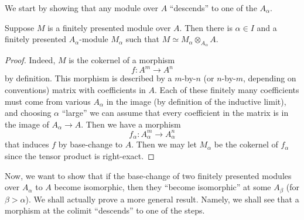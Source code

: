 We start by showing that any module over $A$ ``descends'' to one of the
$A_\alpha$.
\begin{proposition} \label{descentfpmodule} 
Suppose $M$ is a finitely presented module over $A$. Then there is $\alpha \in
I$ and a finitely presented $A_\alpha$-module $M_\alpha$ such that $M \simeq
M_\alpha \otimes_{A_\alpha} A$. 
\end{proposition} 
\begin{proof} 
Indeed, $M$ is the cokernel of a morphism
\[ f: A^m \to A^n   \]
by definition. This morphism is described by a $m$-by-$n$ (or $n$-by-$m$,
depending on conventions) matrix with coefficients in $A$. Each of these
finitely many coefficients must come from various $A_\alpha$ in the image (by
definition of the inductive limit), and choosing $\alpha$ ``large'' we can
assume that every coefficient in the matrix is in the image of $A_\alpha \to A$.
Then we have a morphism
\[ f_\alpha:  A_\alpha^m \to A_\alpha^n  \]
that induces $f$ by base-change to $A$. Then we may let $M_\alpha$ be the
cokernel of $f_\alpha$ since the tensor product is right-exact.
\end{proof} 

Now, we want to show that if the base-change of two finitely presented modules
over $A_\alpha$ to $A$ become isomorphic, then they ``become isomorphic'' at some
$A_\beta $ (for $\beta > \alpha$).
We shall actually prove a more general result.
Namely, we shall see that 
a morphism at the colimit ``descends'' to one of the steps.


